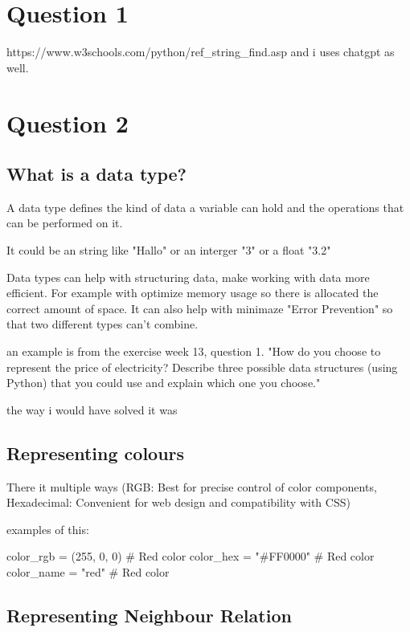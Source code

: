 \documentclass{article}
\begin{document}
\section{Question 1}


https://www.w3schools.com/python/ref_string_find.asp and i uses chatgpt as well. 



\section{Question 2}


\subsection{What is a data type?}

A data type defines the kind of data a variable can hold and the operations that can be performed on it. 

It could be an string like "Hallo" or an interger "3" or a float "3.2" 

Data types can help with structuring data, make working with data more efficient. For example with optimize memory usage so there is allocated the correct amount of space. It can also help with minimaze "Error Prevention" so that two different types can't combine.

an example is from the exercise week 13, question 1. "How do you choose to represent the price of electricity? Describe three possible data structures (using Python) that you could use and explain which one you choose."


the way i would have solved it was





\subsection{Representing colours}

There it multiple ways (RGB: Best for precise control of color components, Hexadecimal: Convenient for web design and compatibility with CSS) 


examples of this:

color_rgb = (255, 0, 0)  # Red color
color_hex = "#FF0000"  # Red color
color_name = "red"  # Red color


\subsection{Representing Neighbour Relation}
\end{document}
